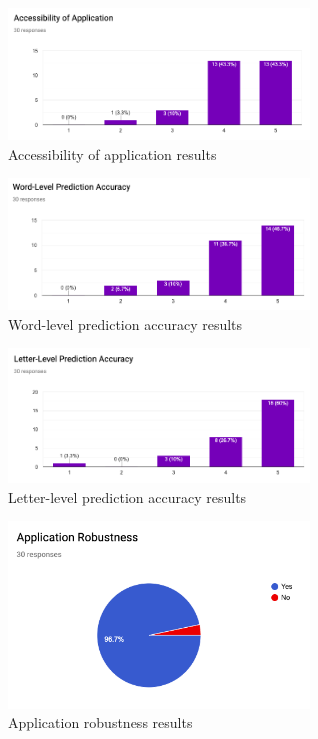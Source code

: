 \documentclass[journal]{./IEEE/IEEEtran}
\begin{document}
\begin{figure}[!ht]
\begin{center}

\includegraphics[width=80mm]{images/q1.png}
\caption{Accessibility of application results}

\end{center}
\end{figure}

\begin{figure}[!ht]
\begin{center}

\includegraphics[width=80mm]{images/q2.png}
\caption{Word-level prediction accuracy results}

\end{center}
\end{figure}

\begin{figure}[!ht]
\begin{center}

\includegraphics[width=80mm]{images/q3.png}
\caption{Letter-level prediction accuracy results}

\end{center}
\end{figure}

\begin{figure}[!ht]
\begin{center}

\includegraphics[width=80mm]{images/q4.png}
\caption{Application robustness results}

\end{center}
\end{figure}
\end{document}
